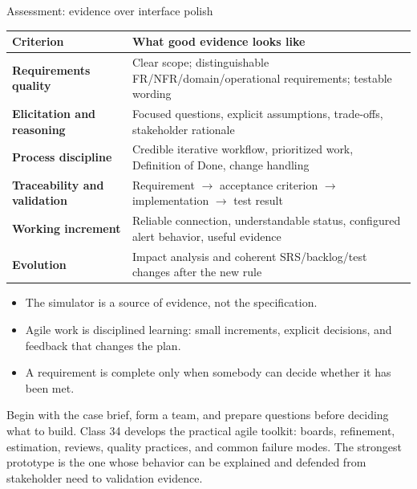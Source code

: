 \begin{frame}{Assessment: evidence over interface polish}
\begin{tabularx}{\textwidth}{>{\bfseries}l X}
Criterion & What good evidence looks like \\
\toprule
Requirements quality & Clear scope; distinguishable FR/NFR/domain/operational requirements; testable wording \\
Elicitation and reasoning & Focused questions, explicit assumptions, trade-offs, stakeholder rationale \\
Process discipline & Credible iterative workflow, prioritized work, Definition of Done, change handling \\
Traceability and validation & Requirement $\rightarrow$ acceptance criterion $\rightarrow$ implementation $\rightarrow$ test result \\
Working increment & Reliable connection, understandable status, configured alert behavior, useful evidence \\
Evolution & Impact analysis and coherent SRS/backlog/test changes after the new rule \\
\bottomrule
\end{tabularx}
\coursefooter
\end{frame}

\classclosingframe
{\begin{itemize}\item The simulator is a source of evidence, not the specification.\item Agile work is disciplined learning: small increments, explicit decisions, and feedback that changes the plan.\item A requirement is complete only when somebody can decide whether it has been met.\end{itemize}}
{Begin with the case brief, form a team, and prepare questions before deciding what to build.}
{Class 34 develops the practical agile toolkit: boards, refinement, estimation, reviews, quality practices, and common failure modes.}
{The strongest prototype is the one whose behavior can be explained and defended from stakeholder need to validation evidence.}


